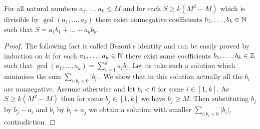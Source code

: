 %

\begin{claim}\label{cl:gcd}
For all natural numbers $a_1, \ldots, a_k \leq M$ and for each $S \geq k(M^2-M)$ which is divisible by $\gcd(a_1, \ldots, a_k)$
there exist nonnegative coefficients $b_1, \ldots, b_k \in \mathbb{N}$ such that $S = a_1 b_1 + \ldots + a_k b_k$.
\end{claim}

\begin{proof}
The following fact is called Bezout's identity and can be easily proved by induction on $k$: 
for each $a_1, \ldots, a_k \in \mathbb{N}$ there exist some coefficients $b_1, \ldots, b_k \in \mathbb{Z}$ such
that $\gcd(a_1, \ldots, a_k) = \sum_{i=1}^k a_i b_i$.  Let us take such a solution which minimises the sum $\sum_{i: b_i < 0} |b_i|$.
We show that in this solution actually all the $b_i$ are nonnegative. Assume otherwise and let $b_i < 0$ for some $i \in [1,k]$.
As $S \geq k(M^2-M)$ then for some $b_j \in [1,k]$ we have $b_j \geq M$. Then substituting $b_j$ by $b_j - a_i$ and
$b_i$ by $b_i + a_j$ we obtain a solution with smaller $\sum_{i: b_i < 0} |b_i|$, contradiction.
\end{proof}


